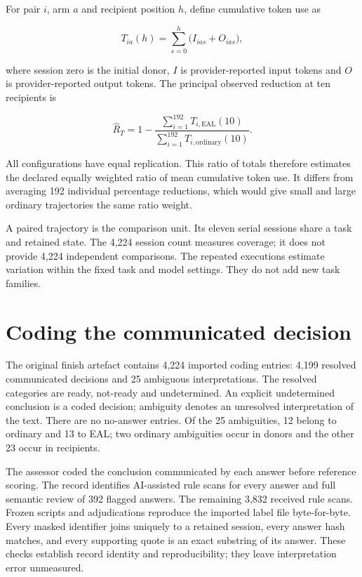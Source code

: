 \documentclass[preprint,11pt]{elsarticle}
\begin{document}
For pair \(i\), arm \(a\) and recipient position \(h\), define
cumulative token use as

\[
T_{ia}(h)=\sum_{s=0}^{h}\bigl(I_{ias}+O_{ias}\bigr),
\]

where session zero is the initial donor, \(I\) is provider-reported
input tokens and \(O\) is provider-reported output tokens. The principal
observed reduction at ten recipients is

\[
\widehat R_T=1-\frac{\sum_{i=1}^{192}T_{i,\mathrm{EAL}}(10)}{\sum_{i=1}^{192}T_{i,\mathrm{ordinary}}(10)}.
\]

All configurations have equal replication. This ratio of totals
therefore estimates the declared equally weighted ratio of mean
cumulative token use. It differs from averaging 192 individual
percentage reductions, which would give small and large ordinary
trajectories the same ratio weight.

A paired trajectory is the comparison unit. Its eleven serial sessions
share a task and retained state. The 4,224 session count measures
coverage; it does not provide 4,224 independent comparisons. The
repeated executions estimate variation within the fixed task and model
settings. They do not add new task families.

\FloatBarrier

\hypertarget{coding-the-communicated-decision}{%
\section{Coding the communicated
decision}\label{coding-the-communicated-decision}}

The original finish artefact contains 4,224 imported coding entries:
4,199 resolved communicated decisions and 25 ambiguous interpretations.
The resolved categories are ready, not-ready and undetermined. An
explicit undetermined conclusion is a coded decision; ambiguity denotes
an unresolved interpretation of the text. There are no no-answer
entries. Of the 25 ambiguities, 12 belong to ordinary and 13 to EAL; two
ordinary ambiguities occur in donors and the other 23 occur in
recipients.

The assessor coded the conclusion communicated by each answer before
reference scoring. The record identifies AI-assisted rule scans for
every answer and full semantic review of 392 flagged answers. The
remaining 3,832 received rule scans. Frozen scripts and adjudications
reproduce the imported label file byte-for-byte. Every masked identifier
joins uniquely to a retained session, every answer hash matches, and
every supporting quote is an exact substring of its answer. These checks
establish record identity and reproducibility; they leave interpretation
error unmeasured.
\end{document}
